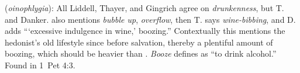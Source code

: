 \item[Boozing,]

(\textit{oinophlygia}):
All Liddell, Thayer, and Gingrich agree on \emph{drunkenness}, but T. and Danker. also mentions \emph{bubble up}, \emph{overflow}, then T. says \emph{wine-bibbing}, and D. adds ```excessive indulgence in wine,' boozing.'' Contextually this mentions the hedonist's old lifestyle since before salvation, thereby a plentiful amount of boozing, which should be heavier than . \emph{Booze} defines as ``to drink alcohol.''
Found in 1~Pet 4:3.
